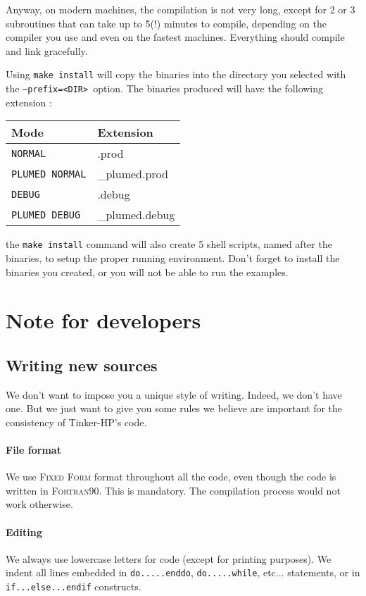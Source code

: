 \documentclass[peerreview]{IEEEtran}
\def\prefix{\texttt{--prefix=<DIR>}}
\begin{document}
Anyway, on modern machines, the compilation is not very long, except for 2 or 3 subroutines that can take up to 5(!) minutes to compile, depending on the compiler you use and even on the fastest machines. Everything should compile and link gracefully.

Using \texttt{make install} will copy the binaries into the directory you selected with the \prefix\ option. The binaries produced will have the following extension :

\begin{center}
\begin{tabular}{|l|l|}
\hline
Mode & Extension \\
\hline
\hline
\texttt{NORMAL} & .prod \\
\texttt{PLUMED NORMAL} & \_plumed.prod \\
\texttt{DEBUG}  & .debug \\
\texttt{PLUMED DEBUG} & \_plumed.debug \\
\hline
\end{tabular}
\end{center}

the \texttt{make install} command will also create 5 shell scripts, named after the binaries, to setup the proper running environment.  Don't forget to install the binaries you created, or you will not be able to run the examples.

\section{Note for developers}
\subsection{Writing new sources}
We don't want to impose you a unique style of writing. Indeed, we don't have one. But we just want to give you some rules we believe are important for the consistency of Tinker-HP's code.

\paragraph{File format}
We use \textsc{Fixed Form} format throughout all the code, even though the code is written in \textsc{Fortran90}. This is mandatory. The compilation process would not work otherwise.
\paragraph{Editing}
We always use lowercase letters for code (except for printing purposes). We indent all lines embedded in \texttt{do.....enddo}, \texttt{do.....while}, etc...  statements, or in \texttt{if...else...endif} constructs. 
\end{document}
